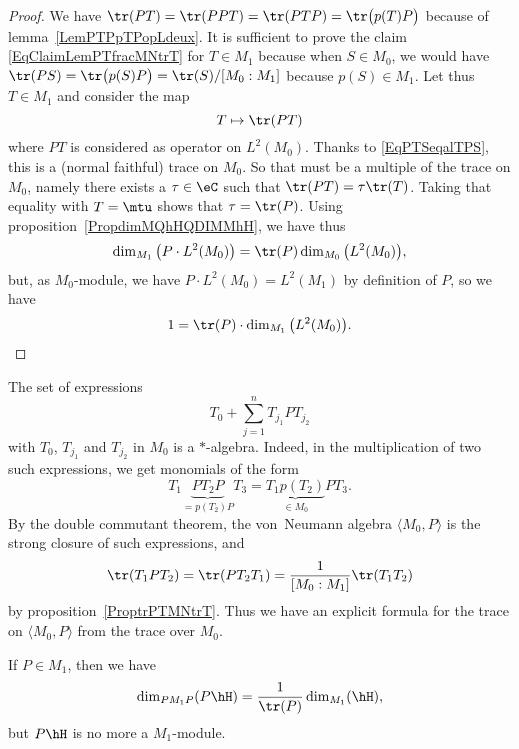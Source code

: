 \begin{proof}
We have $\tr(PT)=\tr(PPT)=\tr(PTP)=\tr\big( p(T)P \big)$ because of lemma~\ref{LemPTPpTPopLdeux}. It is sufficient to prove the claim \eqref{EqClaimLemPTfracMNtrT} for $T\in M_1$ because when $S\in M_0$, we would have $\tr(PS)=\tr\big( p(S)P \big)=\tr(S)/[M_0:M_1]$ because $p(S)\in M_1$. Let thus $T\in M_1$ and consider the map
\begin{equation}
	T\mapsto \tr(PT)
\end{equation}
where $PT$ is considered as operator on $L^2(M_0)$. Thanks to \eqref{EqPTSeqalTPS}, this is a (normal faithful) trace on $M_0$. So that must be a multiple of the trace on $M_0$, namely there exists a $\tau\in\eC$ such that $\tr(PT)=\tau\tr(T)$. Taking that equality with $T=\mtu$ shows that $\tau=\tr(P)$. Using proposition~\ref{PropdimMQhHQDIMMhH}, we have thus
\begin{equation}
	\dim_{M_1}\big( P\cdot L^2(M_0) \big)=\tr(P)\dim_{M_0}\big( L^2(M_0) \big),
\end{equation}
but, as $M_0$-module, we have $P\cdot L^2(M_0)=L^2(M_1)$ by definition of $P$, so we have
\begin{equation}
	1=\tr(P)\cdot \dim_{M_1}\big( L^2(M_0) \big).
\end{equation}

\end{proof}


The set of expressions
\begin{equation}
	T_0+\sum_{j=1}^nT_{j_1}PT_{j_2}
\end{equation}
with $T_0$, $T_{j_1}$ and $T_{j_2}$ in $M_0$ is a $*$-algebra. Indeed, in the multiplication of two such expressions, we get monomials of the form
\begin{equation}
	T_1\underbrace{PT_2 P}_{=p(T_2)P}T_3=\underbrace{T_1p(T_2)}_{\in M_0}PT_3.
\end{equation}
By the double commutant theorem, the von~Neumann algebra $\langle M_0, P\rangle $ is the strong closure of such expressions, and
\begin{equation}
	\tr(T_1PT_2)=\tr(PT_2T_1)=\frac{1}{ [M_0:M_1] }\tr(T_1T_2)
\end{equation}
by proposition~\ref{ProptrPTMNtrT}. Thus we have an explicit formula for the trace on $\langle M_0, P\rangle $ from the trace over $M_0$.

\begin{lemma}		\label{lemPhHPNPfrac}
If $P\in M_1$, then we have
\begin{equation}
	\dim_{PM_1P}( P\hH)=\frac{1}{ \tr(P) }\dim_{M_1}(\hH),
\end{equation}
but $P\hH$ is no more a $M_1$-module.
\end{lemma}

